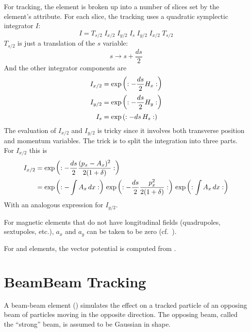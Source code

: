 For tracking, the element is broken up into a number of slices set by
the element's  attribute. For each slice, the tracking
uses a quadratic symplectic integrator $I$:
\begin{equation}
  I = T_{s/2} \; I_{x/2} \; I_{y/2} \; I_s \; I_{y/2} \; I_{x/2} \; T_{s/2}
\end{equation}
$T_{s/2}$ is just a translation of the $s$ variable:
\begin{equation}
  s \rightarrow s + \frac{ds}{2}
\end{equation}
And the other integrator components are
\begin{align}
  I_{x/2} &= \exp \left( : -\frac{ds}{2} H_x : \right) \nonumber \\
  I_{y/2} &= \exp \left( : -\frac{ds}{2} H_y : \right) \\
  I_{s}   &= \exp \left( : -ds \, H_s : \right) \nonumber
\end{align}
The evaluation of $I_{x/2}$ and $I_{y/2}$ is tricky since it involves both transverse
position and momentum variables. The trick is to split the integration into three parts.
For $I_{x/2}$ this is
\begin{align}
  I_{x/2} &= \exp \left( : -\frac{ds}{2} \frac{(p_x - A_x)^2}{2 (1 + \delta)} : \right) \nonumber \\
  &= \exp \left( : -\int A_x \, dx : \right) \,
     \exp \left( : -\frac{ds}{2} \frac{p_x^2}{2 (1 + \delta)} : \right) \,
     \exp \left( : \int A_x \, dx : \right)
  \label{ids2}
\end{align}
With an analogous expression for $I_{y/2}$.

For magnetic elements that do not have longitudinal fields
(quadrupoles, sextupoles, etc.), $a_x$ and $a_y$ can be taken to be
zero (cf.~).

For  and  elements, the vector potential is computed from
.

\section{BeamBeam Tracking}
\label{s:beambeam.std}

A beam-beam element () simulates the effect on a tracked
particle of an opposing beam of particles moving in the opposite
direction. The opposing beam, called the ``strong'' beam, is assumed
to be Gaussian in shape.

